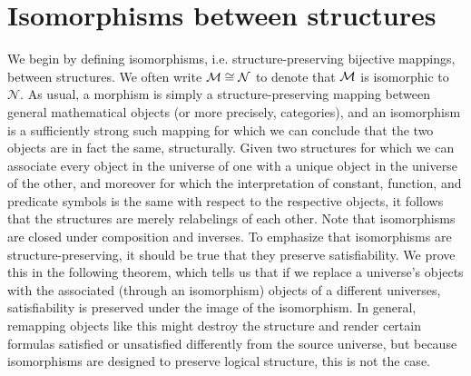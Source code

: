 \documentclass{article}
\begin{document}
\section{Isomorphisms between structures}
We begin by defining isomorphisms, i.e. structure-preserving bijective mappings, between structures.
We often write $ \mathcal{M} \cong \mathcal{N} $ to denote that $ \mathcal{M} $ is isomorphic to $ \mathcal{N} $. As usual, a morphism is simply a structure-preserving mapping between general mathematical objects (or more precisely, categories), and an isomorphism is a sufficiently strong such mapping for which we can conclude that the two objects are in fact the same, structurally. Given two structures for which we can associate every object in the universe of one with a unique object in the universe of the other, and moreover for which the interpretation of constant, function, and predicate symbols is the same with respect to the respective objects, it follows that the structures are merely relabelings of each other. Note that isomorphisms are closed under composition and inverses.
\nn
To emphasize that isomorphisms are structure-preserving, it should be true that they preserve satisfiability. We prove this in the following theorem, which tells us that if we replace a universe's objects with the associated (through an isomorphism) objects of a different universes, satisfiability is preserved under the image of the isomorphism. In general, remapping objects like this might destroy the structure and render certain formulas satisfied or unsatisfied differently from the source universe, but because isomorphisms are designed to preserve logical structure, this is not the case.
\end{document}
